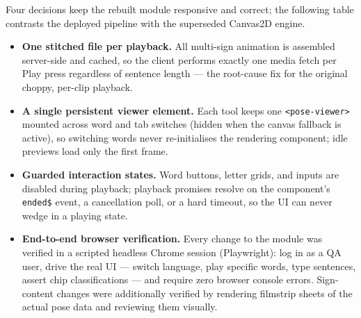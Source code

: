 \noindent Four decisions keep the rebuilt module responsive and correct; the following table contrasts the deployed pipeline with the superseded Canvas2D engine.
\begin{itemize}
\item \textbf{One stitched file per playback.} All multi-sign animation is assembled server-side and cached, so the client performs exactly one media fetch per Play press regardless of sentence length --- the root-cause fix for the original choppy, per-clip playback.
\item \textbf{A single persistent viewer element.} Each tool keeps one \texttt{<pose-viewer>} mounted across word and tab switches (hidden when the canvas fallback is active), so switching words never re-initialises the rendering component; idle previews load only the first frame.
\item \textbf{Guarded interaction states.} Word buttons, letter grids, and inputs are disabled during playback; playback promises resolve on the component's \texttt{ended\$} event, a cancellation poll, or a hard timeout, so the UI can never wedge in a playing state.
\item \textbf{End-to-end browser verification.} Every change to the module was verified in a scripted headless Chrome session (Playwright): log in as a QA user, drive the real UI --- switch language, play specific words, type sentences, assert chip classifications --- and require zero browser console errors. Sign-content changes were additionally verified by rendering filmstrip sheets of the actual pose data and reviewing them visually.
\end{itemize}
\vspace{0.1cm}

